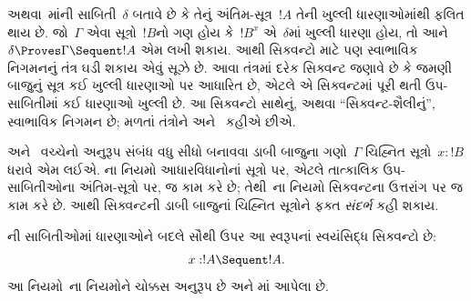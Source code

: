 
\label{guunit:OLP-0669}


 અથવા~માંની
સાબિતી~$\delta$
બતાવે છે કે તેનું
અંતિમ-સૂત્ર~$!A$
તેની ખુલ્લી ધારણાઓમાંથી
ફલિત થાય છે.
જો~$\Gamma$ એવા
સૂત્રો~$!B$નો
ગણ હોય કે~$!B^x$
એ~$\delta$માં
ખુલ્લી ધારણા હોય,
તો આને
$\delta \Proves \Gamma
\Sequent !A$ એમ
લખી શકાય.
આથી સિક્વન્ટો માટે
પણ સ્વાભાવિક નિગમનનું
તંત્ર ઘડી શકાય એવું
સૂઝે છે.
આવા તંત્રમાં દરેક
સિક્વન્ટ જણાવે છે કે
જમણી બાજુનું સૂત્ર
કઈ ખુલ્લી ધારણાઓ
પર આધારિત છે,
એટલે એ સિક્વન્ટમાં
પૂરી થતી ઉપ-સાબિતીમાં
કઈ ધારણાઓ ખુલ્લી છે.
આ સિક્વન્ટો સાથેનું,
અથવા ``સિક્વન્ટ-શૈલીનું'',
સ્વાભાવિક નિગમન છે;
મળતાં તંત્રોને
 અને~
કહીએ છીએ.

 અને~
વચ્ચેનો અનુરૂપ સંબંધ
વધુ સીધો બનાવવા
ડાબી બાજુના ગણો~$\Gamma$
ચિહ્નિત
સૂત્રો~$x:!B$
ધરાવે એમ લઈએ.
ના નિયમો
આધારવિધાનોનાં
સૂત્રો પર,
એટલે તાત્કાલિક
ઉપ-સાબિતીઓના
અંતિમ-સૂત્રો પર,
જ કામ કરે છે;
તેથી~ના
નિયમો સિક્વન્ટના
ઉત્તરાંગ પર જ
કામ કરે છે.
આથી સિક્વન્ટની
ડાબી બાજુનાં
ચિહ્નિત સૂત્રોને
ફક્ત \emph{સંદર્ભ}
કહી શકાય.

ની સાબિતીઓમાં
ધારણાઓને બદલે
સૌથી ઉપર
આ સ્વરૂપનાં
સ્વયંસિદ્ધ સિક્વન્ટો છે:
\[x:!A \Sequent !A.\]
આ નિયમો~ના
નિયમોને ચોક્કસ અનુરૂપ
છે અને
માં
આપેલા છે.

\begingroup
\makeatletter{}\makeatother

\label{guunit:OLP-0667}



